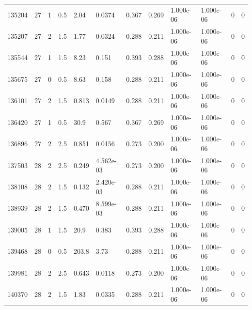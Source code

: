 \documentclass[preview]{standalone}
\begin{document}
{{{{{{\begin{tabular}{L{1.2cm}C{1.2cm} C{0.3cm}C{0.5cm} C{1.4cm}C{1.4cm} C{1.4cm}C{1.4cm} C{1.6cm}C{1.6cm} C{1.6cm}C{1.6cm}}
  135204  &    27  & 1     & 0.5 &  2.04  & 0.0374  &  0.367&   0.269& 1.000e-06 & 1.000e-06   &  0 & 0  \\ 
  135207  &    27  & 2     & 1.5 &  1.77  & 0.0324  &  0.288&   0.211& 1.000e-06 & 1.000e-06   &  0 & 0  \\ 
  135544  &    27  & 1     & 1.5 &  8.23  & 0.151  &  0.393&   0.288& 1.000e-06 & 1.000e-06   &  0 & 0  \\ 
  135675  &    27  & 0     & 0.5 &  8.63  & 0.158  &  0.288&   0.211& 1.000e-06 & 1.000e-06   &  0 & 0  \\ 
  136101  &    27  & 2     & 1.5 &  0.813  & 0.0149  &  0.288&   0.211& 1.000e-06 & 1.000e-06   &  0 & 0  \\ 
  136420  &    27  & 1     & 0.5 &  30.9  & 0.567  &  0.367&   0.269& 1.000e-06 & 1.000e-06   &  0 & 0  \\ 
  136896  &    27  & 2     & 2.5 &  0.851  & 0.0156  &  0.273&   0.200& 1.000e-06 & 1.000e-06   &  0 & 0  \\ 
  137503  &    28  & 2     & 2.5 &  0.249  & 4.562e-03  &  0.273&   0.200& 1.000e-06 & 1.000e-06   &  0 & 0  \\ 
  138108  &    28  & 2     & 1.5 &  0.132  & 2.420e-03  &  0.288&   0.211& 1.000e-06 & 1.000e-06   &  0 & 0  \\ 
  138939  &    28  & 2     & 1.5 &  0.470  & 8.599e-03  &  0.288&   0.211& 1.000e-06 & 1.000e-06   &  0 & 0  \\ 
  139005  &    28  & 1     & 1.5 &  20.9  & 0.383  &  0.393&   0.288& 1.000e-06 & 1.000e-06   &  0 & 0  \\ 
  139468  &    28  & 0     & 0.5 &  203.8  & 3.73  &  0.288&   0.211& 1.000e-06 & 1.000e-06   &  0 & 0  \\ 
  139981  &    28  & 2     & 2.5 &  0.643  & 0.0118  &  0.273&   0.200& 1.000e-06 & 1.000e-06   &  0 & 0  \\ 
  140370  &    28  & 2     & 1.5 &  1.83  & 0.0335  &  0.288&   0.211& 1.000e-06 & 1.000e-06   &  0 & 0  \\ 
\hline 
\end{tabular} 

}}}}}}
\end{document}
